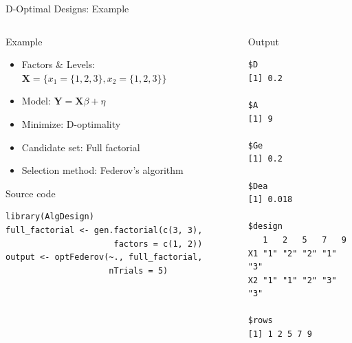 \documentclass[10pt, compress, aspectratio=169, xcolor={table,usenames,dvipsnames}]{beamer}
\begin{document}
\begin{frame}[fragile,label={sec:org5e45be3}]{D-Optimal Designs: Example}
 \begin{columns}
\begin{column}{0.5\columnwidth}
\begin{block}{Example}
\begin{itemize}
\item Factors \& Levels: \(\mathbf{X} = \{x_1 = \{1, 2, 3\}, x_2 = \{1, 2, 3\}\}\)
\item Model: \(\mathbf{Y} = \mathbf{X}\beta + \eta\)
\item Minimize: \alert{D-optimality}
\item Candidate set: \alert{Full factorial}
\item Selection method: \alert{Federov's algorithm}
\end{itemize}

\begin{block}{Source code}
\lstset{language=r,label= ,caption= ,captionpos=b,numbers=none}
\begin{lstlisting}
library(AlgDesign)
full_factorial <- gen.factorial(c(3, 3),
                      factors = c(1, 2))
output <- optFederov(~., full_factorial,
                     nTrials = 5)
\end{lstlisting}
\end{block}
\end{block}
\end{column}

\begin{column}{0.5\columnwidth}
\begin{block}{Output}
\scriptsize

\begin{verbatim}
$D
[1] 0.2

$A
[1] 9

$Ge
[1] 0.2

$Dea
[1] 0.018

$design
   1   2   5   7   9
X1 "1" "2" "2" "1" "3"
X2 "1" "1" "2" "3" "3"

$rows
[1] 1 2 5 7 9
\end{verbatim}

\normalsize
\end{block}
\end{column}
\end{columns}
\end{frame}
\end{document}
